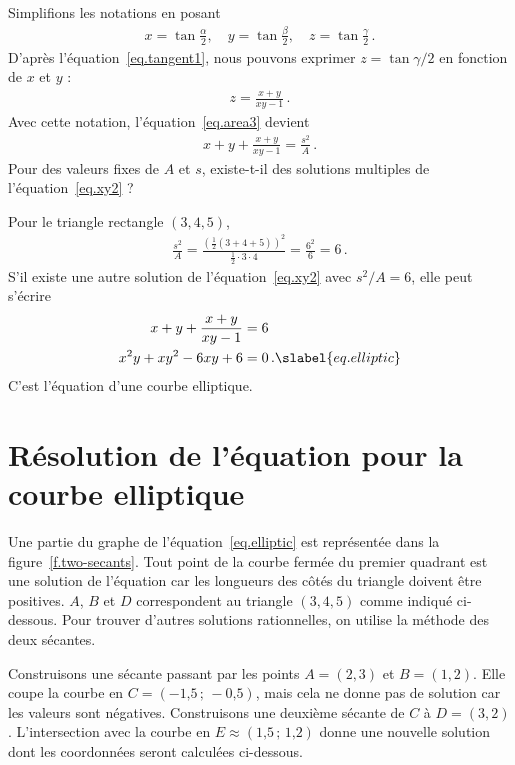 Simplifions les notations en posant 
\begin{align}
x=\tan \frac{\alpha}{2},\quad
y=\tan \frac{\beta}{2},\quad
z=\tan \frac{\gamma}{2}\,.\label{eq.variables-for-tangents}
\end{align}
D'après l'équation~\ref{eq.tangent1},  nous pouvons exprimer $z=\tan\gamma/2$ en fonction de $x$ et $y$ :
\begin{align}
z = \frac{x+y}{xy-1}\,.\label{eq.xy1}
\end{align}
Avec cette notation, l'équation~\ref{eq.area3} devient 
\begin{align}
x+y+\frac{x+y}{xy-1}=\frac{s^2}{A}\,.\label{eq.xy2}
\end{align}
Pour des valeurs fixes de $A$ et $s$, existe-t-il des solutions multiples de l'équation~\ref{eq.xy2} ?

Pour le triangle rectangle $(3,4,5)$,
\begin{align}
\frac{s^2}{A} = \frac{\left(\frac{1}{2}(3+4+5)\right)^2}{\frac{1}{2}\cdot 3\cdot 4} = \frac{6^2}{6}=6\,.
\end{align}
S'il existe une autre solution de l'équation~\ref{eq.xy2} avec $s^2/A=6$, elle peut s'écrire 
\begin{subequations}
\begin{align}
x+y+\frac{x+y}{xy-1}&=6\\
x^2y + xy^2 -6xy + 6 &= 0\,.\slabel{eq.elliptic}
\end{align}
\end{subequations}
C'est l'équation d'une courbe elliptique.

\section{Résolution de l'équation pour la courbe elliptique}

Une partie du graphe de l'équation~\ref{eq.elliptic} est représentée dans la figure~\ref{f.two-secants}. Tout point de la courbe fermée du premier quadrant est une solution de l'équation car les longueurs des côtés du triangle doivent être positives. $A$, $B$ et $D$ correspondent au triangle $(3,4,5)$ comme indiqué ci-dessous. Pour trouver d'autres solutions rationnelles, on utilise la méthode des deux sécantes.

Construisons une sécante passant par les points $A=(2,3)$ et $B=(1,2)$. Elle coupe la courbe en $C=(-\mbox{1,5}\,;\,-\mbox{0,5})$, mais cela ne donne pas de solution car les valeurs sont négatives. Construisons une deuxième sécante de $C$ à $D=(3,2)$. L'intersection avec la courbe en $E\approx (\mbox{1,5}\,;\,\mbox{1,2})$ donne une nouvelle solution dont les coordonnées seront calculées ci-dessous.

